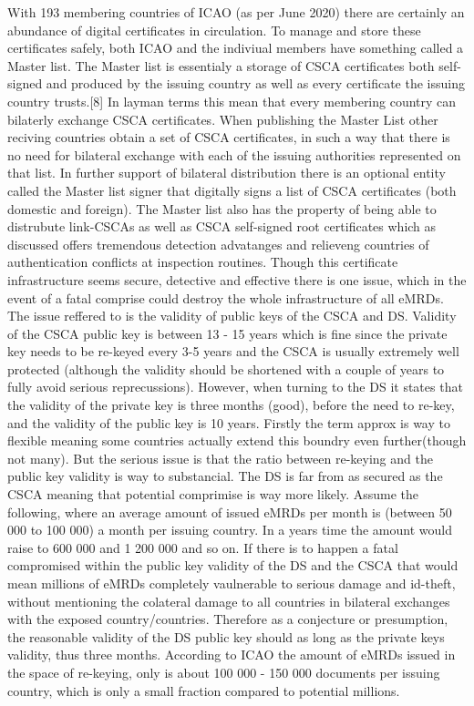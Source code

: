 \documentclass[12pt,
               a4paper,
               article,
               oneside,
               oldfontcommands,
               english]{memoir}
\begin{document}
With 193 membering countries of ICAO  (as per June 2020) \cite{ICAO_4} there are certainly an abundance of digital certificates in circulation. To manage and store these certificates safely, both ICAO and the indiviual members have something called a Master list. The Master list is essentialy a storage of CSCA certificates both self-signed and produced by the issuing country as well as every certificate the issuing country trusts.[8] In layman terms this mean that every membering country can bilaterly exchange CSCA certificates. When publishing the Master List other reciving countries obtain a set of CSCA certificates, in such a way that there is no need for bilateral exchange with each of the issuing authorities represented on that list. In further support of bilateral distribution there is an optional entity called the Master list signer that digitally signs a list of CSCA certificates (both domestic and foreign). The Master list also has the property of being able to distrubute link-CSCAs as well as CSCA self-signed root certificates which as discussed offers tremendous detection advatanges and relieveng countries of authentication conflicts at inspection routines. Though this certificate infrastructure seems secure, detective and effective there is one issue, which in the event of a fatal comprise could destroy the whole infrastructure of all eMRDs. The issue reffered to is the validity of public keys of the CSCA and DS. Validity of the CSCA public key is between 13 - 15 years which is fine since the private key needs to be re-keyed every 3-5 years and the CSCA is usually extremely well protected (although the validity should be shortened with a couple of years to fully avoid serious reprecussions). However, when turning to the DS it states that the validity of the private key is three months (good), before the need to re-key, and the validity of the public key is  10 years. Firstly the term approx is way to flexible meaning some countries actually extend this boundry even further(though not many). But the serious issue is that the ratio between re-keying and the public key validity is way to substancial. The DS is far from as secured as the CSCA meaning that potential comprimise is way more likely. Assume the following, where an average amount of issued eMRDs per month is (between 50 000 to 100 000) a month per issuing country. In a years time the amount would raise to 600 000 and 1 200 000 and so on. If there is to happen a fatal compromised within the public key validity of the DS and the CSCA that would mean millions of eMRDs completely vaulnerable to serious damage and id-theft, without mentioning the colateral damage to all countries in bilateral exchanges with the exposed country/countries. Therefore as a conjecture or presumption, the reasonable validity of the DS public key should as long as the private keys validity, thus three months. According to ICAO the amount of eMRDs issued in the space of re-keying, only is about 100 000 - 150  000 documents per issuing country\cite{ICAO_5}, which is only a small fraction compared to potential millions.
\end{document}
